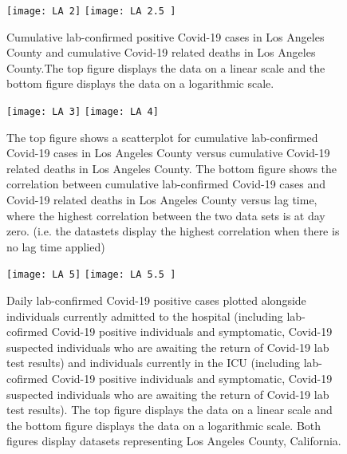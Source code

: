 \documentclass{article}
\begin{document}
\FloatBarrier

\begin{figure}[!htbp]
	\begin{center}
		\texttt{[image: LA 2]}
		\vspace{1mm}
		\texttt{[image: LA 2.5 ]}
		\caption{Cumulative lab-confirmed positive Covid-19 cases in Los Angeles County and cumulative Covid-19 related deaths in Los Angeles County.The top figure displays the data on a linear scale and the bottom figure displays the data on a logarithmic scale. }
		\label{fig:8}
	\end{center}
\end{figure}

\FloatBarrier

\begin{figure}[!htbp]
	\begin{center}
		\texttt{[image: LA 3]}
		\vspace{1mm}
		\texttt{[image: LA 4]}
		\caption{ The top figure shows a scatterplot for cumulative lab-confirmed Covid-19 cases in Los Angeles County versus cumulative Covid-19 related deaths in Los Angeles County. The bottom figure shows the correlation between cumulative lab-confirmed Covid-19 cases and Covid-19 related deaths in Los Angeles County versus lag time, where the highest correlation between the two data sets is at day zero. (i.e. the datastets display the highest correlation when there is no lag time applied)}
		\label{fig:9}
	\end{center}
\end{figure}

\FloatBarrier

\begin{figure}[!htbp]
	\begin{center}
		\texttt{[image: LA 5]}
		\vspace{1mm}
		\texttt{[image: LA 5.5 ]}
		\caption{ Daily lab-confirmed Covid-19 positive cases plotted alongside individuals currently admitted to the hospital (including lab-cofirmed Covid-19 positive individuals and symptomatic, Covid-19 suspected individuals who are awaiting the return of Covid-19 lab test results) and individuals currently in the ICU (including lab-cofirmed Covid-19 positive individuals and symptomatic, Covid-19 suspected individuals who are awaiting the return of Covid-19 lab test results). The top figure displays the data on a linear scale and the bottom figure displays the data on a logarithmic scale. Both figures display datasets representing Los Angeles County, California. }
		\label{fig:10}
	\end{center}
\end{figure}
\end{document}
